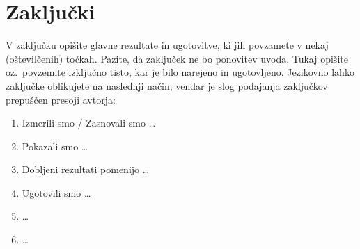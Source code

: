 \chapter{Zaključki}\label{cha:zakljucki}

V zaključku opišite glavne rezultate in ugotovitve, ki jih povzamete v nekaj (oštevilčenih) točkah. Pazite, da zaključek ne bo ponovitev uvoda. Tukaj opišite oz.\ povzemite izključno tisto, kar je bilo narejeno in ugotovljeno. Jezikovno lahko zaključke oblikujete na naslednji način, vendar je slog podajanja zaključkov prepuščen presoji avtorja:
\begin{enumerate}
\item Izmerili smo / Zasnovali smo \ldots
\item Pokazali smo \ldots
\item Dobljeni rezultati pomenijo \ldots
\item Ugotovili smo \ldots
\item \ldots
\item \ldots
\end{enumerate}

 
